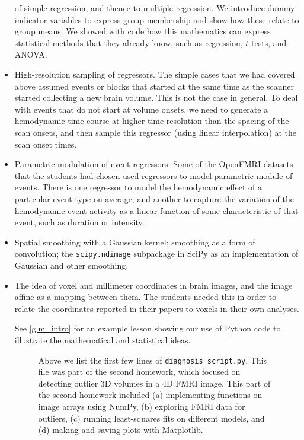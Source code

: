 \begin{itemize}
        of simple regression, and thence to multiple regression.  We introduce
        dummy indicator variables to express group membership and show how
        these relate to group means.  We showed with code how this mathematics
        can express statistical methods that they already know, such as
        regression, $t$-tests, and ANOVA.
\item
    High-resolution sampling of regressors.  The simple cases that we had
        covered above assumed events or blocks that started at the same time
        as the scanner started collecting a new brain volume.  This is not the
        case in general.  To deal with events that do not start at volume
        onsets, we need to generate a hemodynamic time-course at higher
        time resolution than the spacing of the scan onsets, and then sample
        this regressor (using linear interpolation) at the scan onset times.
\item
    Parametric modulation of event regressors.  Some of the OpenFMRI datasets
        that the students had chosen used regressors to model parametric
        module of events.  There is one regressor to model the hemodynamic
        effect of a particular event type on average, and another to capture
        the variation of the hemodynamic event activity as a linear function
        of some characteristic of that event, such as duration or intensity.
\item
    Spatial smoothing with a Gaussian kernel; smoothing as a form of
    convolution; the \texttt{scipy.ndimage} subpackage in SciPy as an
    implementation of Gaussian and other smoothing.

\item
    The idea of voxel and millimeter coordinates in brain images, and the
    image affine as a mapping between them.  The students needed this in order
    to relate the coordinates reported in their papers to voxels in their own
    analyses.

See \cref{glm_intro} for an example lesson showing our use of Python code to
illustrate the mathematical and statistical ideas.

\begin{figure}
\centering

\caption{Above we list the first few lines of \texttt{diagnosis\_script.py}.
This file was part of the second homework, which focused on detecting outlier
3D volumes in a 4D FMRI image.
This part of the second homework included
(a) implementing functions on image arrays using NumPy,
(b) exploring FMRI data for outliers,
(c) running least-squares fits on different models, and
(d) making and saving plots with Matplotlib.}\label{fig:diagnosis_script}
\end{figure}


\end{itemize}
